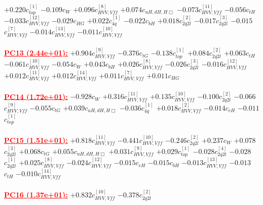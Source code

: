 \documentclass{article}
\begin{document}
{$+0.220$}{\rm $c_{top}^{[1]}$}
{$-0.109$}{\rm $c_{W}$}
{$+0.096$}{\rm $c_{HVV,Vff}^{[8]}$}
{$+0.074$}{\rm $c_{uH,dH,H\Box}$}
{$-0.073$}{\rm $c_{HVV,Vff}^{[11]}$}
{$-0.056$}{\rm $c_{tH}$}
{$-0.033$}{\rm $c_{HVV,Vff}^{[12]}$}
{$-0.029$}{\rm $c_{HG}$}
{$+0.022$}{\rm $c_{4q}^{[1]}$}
{$-0.022$}{\rm $c_{bH}$}
{$+0.018$}{\rm $c_{2q2l}^{[2]}$}
{$-0.017$}{\rm $c_{2q2l}^{[3]}$}
{$-0.015$}{\rm $c_{HVV,Vff}^{[7]}$}
{$-0.014$}{\rm $c_{HVV,Vff}^{[13]}$}
{$-0.011$}{\rm $c_{HVV,Vff}^{[10]}$}
 \nonumber \\ \nonumber \\
\noindent \textcolor{red}{\underline{\bf{PC13} (2.44e+01):}}
{$+0.904$}{\rm $c_{HVV,Vff}^{[9]}$}
{$-0.376$}{\rm $c_{tG}$}
{$-0.138$}{\rm $c_{top}^{[1]}$}
{$+0.084$}{\rm $c_{2q2l}^{[2]}$}
{$+0.063$}{\rm $c_{tH}$}
{$-0.061$}{\rm $c_{HVV,Vff}^{[10]}$}
{$-0.054$}{\rm $c_{W}$}
{$+0.043$}{\rm $c_{bH}$}
{$+0.026$}{\rm $c_{HVV,Vff}^{[8]}$}
{$-0.026$}{\rm $c_{2q2l}^{[3]}$}
{$-0.016$}{\rm $c_{HVV,Vff}^{[12]}$}
{$+0.012$}{\rm $c_{HVV,Vff}^{[11]}$}
{$+0.012$}{\rm $c_{HVV,Vff}^{[14]}$}
{$+0.011$}{\rm $c_{HVV,Vff}^{[7]}$}
{$+0.011$}{\rm $c_{HG}$}
 \nonumber \\ \nonumber \\
\noindent \textcolor{red}{\underline{\bf{PC14} (1.72e+01):}}
{$-0.928$}{\rm $c_{W}$}
{$+0.316$}{\rm $c_{HVV,Vff}^{[11]}$}
{$+0.135$}{\rm $c_{HVV,Vff}^{[10]}$}
{$-0.100$}{\rm $c_{2q2l}^{[2]}$}
{$-0.066$}{\rm $c_{HVV,Vff}^{[9]}$}
{$-0.055$}{\rm $c_{tG}$}
{$+0.039$}{\rm $c_{uH,dH,H\Box}$}
{$-0.036$}{\rm $c_{4q}^{[1]}$}
{$+0.018$}{\rm $c_{HVV,Vff}^{[2]}$}
{$-0.014$}{\rm $c_{eH}$}
{$-0.011$}{\rm $c_{top}^{[1]}$}
 \nonumber \\ \nonumber \\
\noindent \textcolor{red}{\underline{\bf{PC15} (1.51e+01):}}
{$+0.818$}{\rm $c_{HVV,Vff}^{[11]}$}
{$-0.441$}{\rm $c_{HVV,Vff}^{[10]}$}
{$-0.246$}{\rm $c_{2q2l}^{[2]}$}
{$+0.237$}{\rm $c_{W}$}
{$+0.078$}{\rm $c_{2q2l}^{[3]}$}
{$+0.068$}{\rm $c_{tG}$}
{$+0.055$}{\rm $c_{uH,dH,H\Box}$}
{$+0.031$}{\rm $c_{HVV,Vff}^{[9]}$}
{$+0.029$}{\rm $c_{top}^{[1]}$}
{$-0.028$}{\rm $c_{2q2l}^{[4]}$}
{$-0.028$}{\rm $c_{2q2l}^{[1]}$}
{$+0.025$}{\rm $c_{HVV,Vff}^{[8]}$}
{$-0.024$}{\rm $c_{HVV,Vff}^{[12]}$}
{$-0.015$}{\rm $c_{eH}$}
{$-0.015$}{\rm $c_{bH}$}
{$-0.013$}{\rm $c_{HVV,Vff}^{[13]}$}
{$-0.013$}{\rm $c_{tH}$}
{$-0.010$}{\rm $c_{HVV,Vff}^{[14]}$}
 \nonumber \\ \nonumber \\
\noindent \textcolor{red}{\underline{\bf{PC16} (1.37e+01):}}
{$+0.832$}{\rm $c_{HVV,Vff}^{[10]}$}
{$-0.378$}{\rm $c_{2q2l}^{[2]}$}
\end{document}
